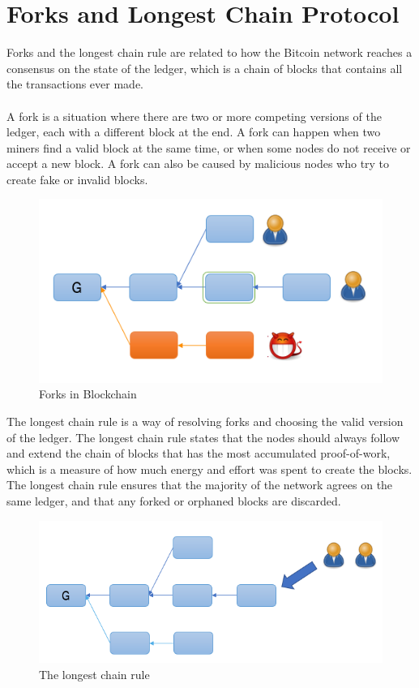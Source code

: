 \documentclass{report}
\begin{document}
\section{Forks and Longest Chain Protocol}
 Forks and the longest chain rule are related to how the Bitcoin network reaches a consensus on the state of the ledger, which is a chain of blocks that contains all the transactions ever made.\\\\
A fork is a situation where there are two or more competing versions of the ledger, each with a different block at the end. A fork can happen when two miners find a valid block at the same time, or when some nodes do not receive or accept a new block. A fork can also be caused by malicious nodes who try to create fake or invalid blocks.
\begin{center}
	\begin{figure}[h!]
		\centering
		\includegraphics[width=0.6\linewidth]{Fig/F1}
		\caption{Forks in Blockchain}
		\label{fig:f1}
	\end{figure}
\end{center}
The longest chain rule is a way of resolving forks and choosing the valid version of the ledger. The longest chain rule states that the nodes should always follow and extend the chain of blocks that has the most accumulated proof-of-work, which is a measure of how much energy and effort was spent to create the blocks. The longest chain rule ensures that the majority of the network agrees on the same ledger, and that any forked or orphaned blocks are discarded.
\begin{center}
	\begin{figure}[h!]
		\centering
		\includegraphics[width=0.6\linewidth]{Fig/F2}
		\caption{The longest chain rule}
		\label{fig:f2}
	\end{figure}
\end{center}
\end{document}
